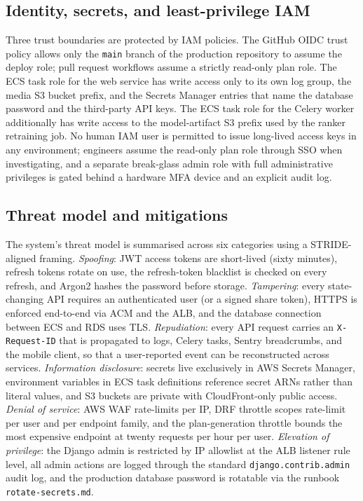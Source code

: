 \subsection{Identity, secrets, and least-privilege IAM}

Three trust boundaries are protected by IAM policies. The GitHub OIDC trust policy allows only the \texttt{main} branch of the production repository to assume the deploy role; pull request workflows assume a strictly read-only plan role. The ECS task role for the web service has write access only to its own log group, the media S3 bucket prefix, and the Secrets Manager entries that name the database password and the third-party API keys. The ECS task role for the Celery worker additionally has write access to the model-artifact S3 prefix used by the ranker retraining job. No human IAM user is permitted to issue long-lived access keys in any environment; engineers assume the read-only plan role through SSO when investigating, and a separate break-glass admin role with full administrative privileges is gated behind a hardware MFA device and an explicit audit log.

\subsection{Threat model and mitigations}

The system's threat model is summarised across six categories using a STRIDE-aligned framing. \emph{Spoofing}: JWT access tokens are short-lived (sixty minutes), refresh tokens rotate on use, the refresh-token blacklist is checked on every refresh, and Argon2 hashes the password before storage. \emph{Tampering}: every state-changing API requires an authenticated user (or a signed share token), HTTPS is enforced end-to-end via ACM and the ALB, and the database connection between ECS and RDS uses TLS. \emph{Repudiation}: every API request carries an \texttt{X-Request-ID} that is propagated to logs, Celery tasks, Sentry breadcrumbs, and the mobile client, so that a user-reported event can be reconstructed across services. \emph{Information disclosure}: secrets live exclusively in AWS Secrets Manager, environment variables in ECS task definitions reference secret ARNs rather than literal values, and S3 buckets are private with CloudFront-only public access. \emph{Denial of service}: AWS WAF rate-limits per IP, DRF throttle scopes rate-limit per user and per endpoint family, and the plan-generation throttle bounds the most expensive endpoint at twenty requests per hour per user. \emph{Elevation of privilege}: the Django admin is restricted by IP allowlist at the ALB listener rule level, all admin actions are logged through the standard \texttt{django.contrib.admin} audit log, and the production database password is rotatable via the runbook \texttt{rotate-secrets.md}.

